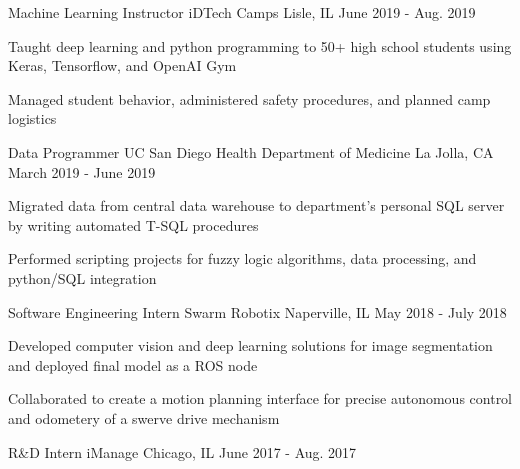 \begin{cventries}
  \cventry
    {Machine Learning Instructor} %
    {iDTech Camps} %
    {Lisle, IL} %
    {June 2019 - Aug. 2019} %
    {
      \begin{cvitems} %
        \item {Taught deep learning and python programming to 50+ high school students using Keras, Tensorflow, and OpenAI Gym}
        \item {Managed student behavior, administered safety procedures, and planned camp logistics}
      \end{cvitems}
    }

  \cventry
    {Data Programmer} %
    {UC San Diego Health Department of Medicine} %
    {La Jolla, CA} %
    {March 2019 - June 2019} %
    {
      \begin{cvitems} %
        \item {Migrated data from central data warehouse to department's personal SQL server by writing automated T-SQL procedures}
        \item {Performed scripting projects for fuzzy logic algorithms, data processing, and python/SQL integration}
      \end{cvitems}
    }

  \cventry
    {Software Engineering Intern} %
    {Swarm Robotix} %
    {Naperville, IL} %
    {May 2018 - July 2018} %
    {
      \begin{cvitems} %
      	\item {Developed computer vision and deep learning solutions for image segmentation and deployed final model as a ROS node}
        \item {Collaborated to create a motion planning interface for precise autonomous control and odometery of a swerve drive mechanism}
      \end{cvitems}
    }

  \cventry
    {R\&D Intern} %
    {iManage} %
    {Chicago, IL} %
    {June 2017 - Aug. 2017} %
    {}
 
\end{cventries}
